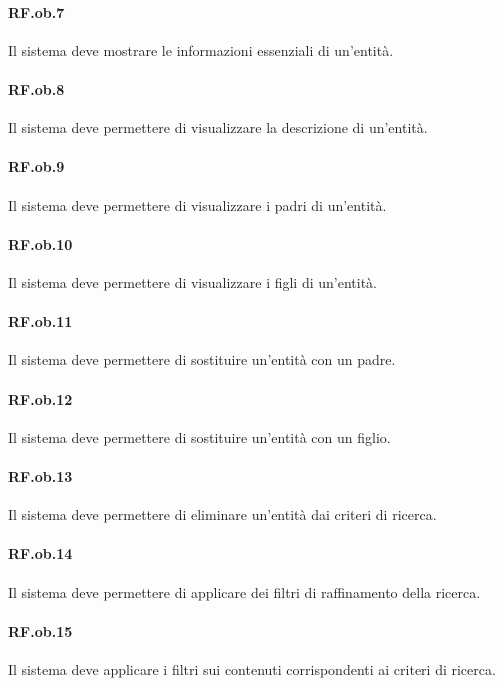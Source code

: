 \documentclass[10pt,a4paper,headinclude,footinclude,hidelinks]{scrreprt} %
\begin{document}
	\paragraph{RF.ob.7} Il sistema deve mostrare le informazioni essenziali di un'entità.

	\paragraph{RF.ob.8} Il sistema deve permettere di visualizzare la descrizione di un'entità.

	\paragraph{RF.ob.9} Il sistema deve permettere di visualizzare i padri di un'entità.

	\paragraph{RF.ob.10} Il sistema deve permettere di visualizzare i figli di un'entità.

	\paragraph{RF.ob.11} Il sistema deve permettere di sostituire un'entità con un padre.

	\paragraph{RF.ob.12} Il sistema deve permettere di sostituire un'entità con un figlio.

	\paragraph{RF.ob.13} Il sistema deve permettere di eliminare un'entità dai criteri di ricerca.

	\paragraph{RF.ob.14} Il sistema deve permettere di applicare dei filtri di raffinamento della ricerca.

	\paragraph{RF.ob.15} Il sistema deve applicare i filtri sui contenuti corrispondenti ai criteri di ricerca.
\end{document}
